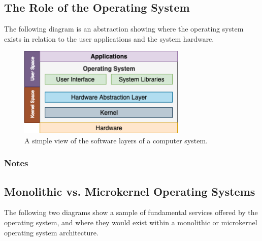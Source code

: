     \subsection*{The Role of the Operating System}
    The following diagram is an abstraction showing where the operating system exists in relation to the user applications and the system hardware.

    \medskip
    \begin{figure}[h]
        \centering
        \includegraphics[width=8cm]{Extras/operating_system_simple}
        \caption{A simple view of the software layers of a computer system.}
    \end{figure}

    \subsubsection*{Notes}

    \vfill


    \pagebreak

    \subsection*{Monolithic vs. Microkernel Operating Systems}

    The following two diagrams show a sample of fundamental services offered by the operating system, and where they would exist within a monolithic or microkernel operating system architecture.

